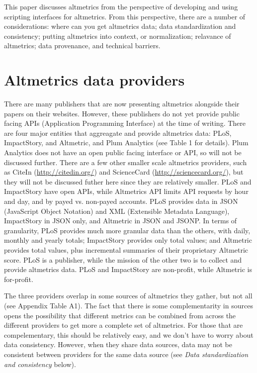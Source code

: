 \documentclass[letterpaper,superscriptaddress,showkeys,longbibliography]{revtex4-1}\usepackage{graphicx, color}
\begin{document}
This paper discusses altmetrics from the perspective of developing and using scripting interfaces for altmetrics. From this perspective, there are a number of considerations: where can you get altmetrics data; data standardization and consistency; putting altmetrics into context, or normalization; relavance of altmetrics; data provenance, and technical barriers.

\section*{Altmetrics data providers}

There are many publishers that are now presenting altmetrics alongside their papers on their websites. However, these publishers do not yet provide public facing APIs (Application Programming Interface) at the time of writing. There are four major entities that aggreagate and provide altmetrics data: PLoS, ImpactStory, and Altmetric, and Plum Analytics (see Table 1 for details). Plum Analytics does not have an open public facing interface or API, so will not be discussed further. There are a few other smaller scale altmetrics providers, such as CiteIn (\url{http://citedin.org/}) and ScienceCard (\url{http://sciencecard.org/}), but they will not be discussed futher here since they are relatively smaller. PLoS and ImpactStory have open APIs, while Altmetrics API limits API requests by hour and day, and by payed vs. non-payed accounts. PLoS provides data in JSON (JavaScript Object Notation) and XML (Extensible Metadata Language), ImpactStory in JSON only, and Altmetric in JSON and JSONP. In terms of granularity, PLoS provides much more granular data than the others, with daily, monthly and yearly totals; ImpactStory provides only total values; and Altmetric provides total values, plus incremental summaries of their proprietary Altmetric score. PLoS is a publisher, while the mission of the other two is to collect and provide altmetrics data. PLoS and ImpactStory are non-profit, while Altmetric is for-profit.

The three providers overlap in some sources of altmetrics they gather, but not all (see Appendix Table A1). The fact that there is some complementarity in sources opens the possibility that different metrics can be combined from across the different providers to get more a complete set of altmetrics. For those that are compelementary, this should be relatively easy, and we don't have to worry about data consistency. However, when they share data sources, data may not be consistent between providers for the same data source (see \emph{Data standardization and consistency} below).
\end{document}
